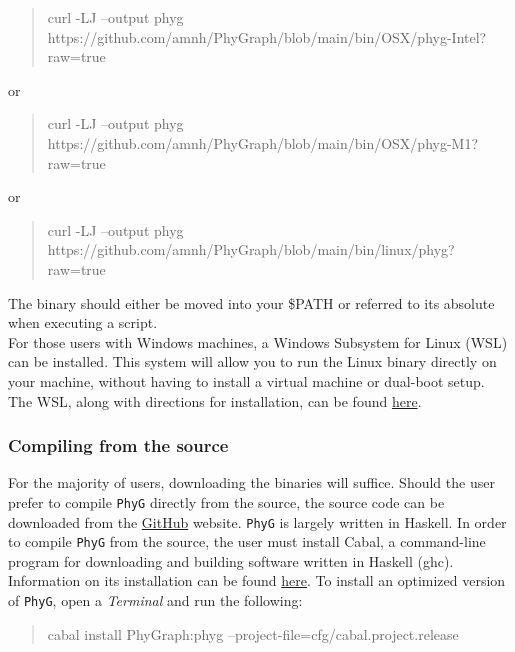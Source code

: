 \documentclass[11pt]{book}
\newcommand{\phyg}{\texttt{PhyG} }
\begin{document}
{{		\begin {quote}
		curl -LJ --output phyg https://github.com/amnh/PhyGraph/blob/main/bin/OSX/phyg-Intel?raw=true
		\end{quote}		
		
		\noindent or 
		
		\begin {quote}
		curl -LJ --output phyg https://github.com/amnh/PhyGraph/blob/main/bin/OSX/phyg-M1?raw=true
		\end{quote}	
		
		\noindent or 
		
		\begin {quote}
		curl -LJ --output phyg https://github.com/amnh/PhyGraph/blob/main/bin/linux/phyg?
		raw=true
		\end{quote}
		
		\noindent The binary should either be moved into your \$PATH or referred to its 
		absolute when executing a script.\\
		
		For those users with Windows machines, a Windows Subsystem for Linux 
		(WSL) can be installed. This system will allow you to run the Linux binary directly 
		on your machine, without having to install a virtual machine or dual-boot setup. 
		The WSL, along with directions for installation, can be found 
		\href{https://learn.microsoft.com/en-us/windows/wsl/}{here}.
	
		\subsubsection{Compiling from the source}
		For the majority of users, downloading the binaries will suffice. Should the user prefer to 
		compile \phyg directly from the source, the source code can be downloaded 
		from the \href{https://github.com/amnh/PhyGraph}{GitHub} website. \phyg is largely 
		written in Haskell. In order to compile \phyg from the source, the user must install Cabal, 
		a command-line program for downloading and building software written in Haskell (ghc).  
		Information on its installation can be found  
		\href{https://www.schoolofhaskell.com/user/simonmichael/how-to-cabal-install}{here}.
		To install an optimized version of \texttt{PhyG}, open a \textit{Terminal} and run the 
		following:
		
		\begin{quote}
		cabal install PhyGraph:phyg --project-file=cfg/cabal.project.release
		\end{quote}
		
}}
\end{document}
